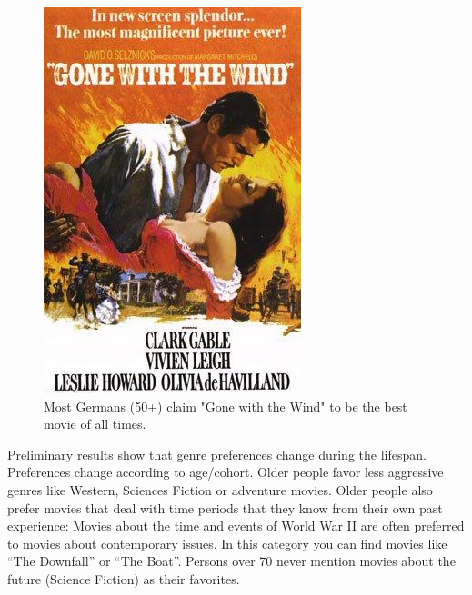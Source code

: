 \begin{figure}
  \begin{center}
    \begin{minipage}[b]{0.40\linewidth}
   \includegraphics[width=\linewidth]{profClemensSchwender-fig3.jpg}
    \end{minipage}\hfill
    \begin{minipage}[b]{0.55\linewidth}
      \caption{Most Germans (50+) claim "Gone with the Wind" to be the best movie of all times.\label{fig3:profClemensSchwender}}
    \end{minipage}
  \end{center}
\end{figure}


 Preliminary results show that genre preferences change during the lifespan. Preferences change according to age/cohort. Older people favor less aggressive genres like Western, Sciences Fiction or adventure movies. Older people also prefer movies that deal with time periods that they know from their own past experience: Movies about the time and events of World War II are often preferred to movies about contemporary issues. In this category you can find movies like ``The Downfall'' or ``The Boat''. Persons over 70 never mention movies about the future (Science Fiction) as their favorites.

